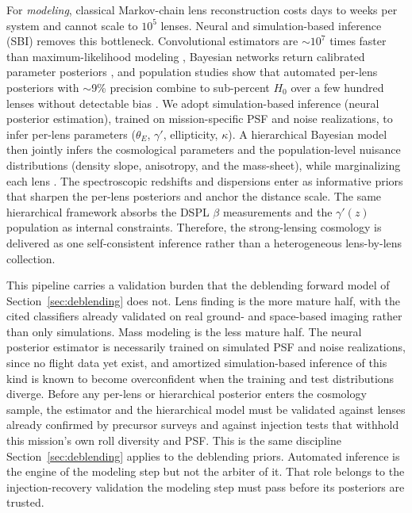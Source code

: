 \documentclass[10pt,onecolumn]{article}
\begin{document}
For \emph{modeling}, classical Markov-chain lens reconstruction costs days to weeks per system and cannot scale to $10^5$ lenses. Neural and simulation-based inference (SBI) removes this bottleneck. Convolutional estimators are $\sim$$10^7$ times faster than maximum-likelihood modeling \cite{hezaveh2017}, Bayesian networks return calibrated parameter posteriors \cite{perreaultlevasseur2017}, and population studies show that automated per-lens posteriors with $\sim$9\% precision combine to sub-percent $H_0$ over a few hundred lenses without detectable bias \cite{park2021}. We adopt simulation-based inference (neural posterior estimation), trained on mission-specific PSF and noise realizations, to infer per-lens parameters ($\theta_E$, $\gamma'$, ellipticity, $\kappa$). A hierarchical Bayesian model then jointly infers the cosmological parameters and the population-level nuisance distributions (density slope, anisotropy, and the mass-sheet), while marginalizing each lens \cite{wagnercarena2021,legin2023}. The spectroscopic redshifts and dispersions enter as informative priors that sharpen the per-lens posteriors and anchor the distance scale. The same hierarchical framework absorbs the DSPL $\beta$ measurements and the $\gamma'(z)$ population as internal constraints. Therefore, the strong-lensing cosmology is delivered as one self-consistent inference rather than a heterogeneous lens-by-lens collection.

This pipeline carries a validation burden that the deblending forward model of Section~\ref{sec:deblending} does not. Lens finding is the more mature half, with the cited classifiers already validated on real ground- and space-based imaging rather than only simulations. Mass modeling is the less mature half. The neural posterior estimator is necessarily trained on simulated PSF and noise realizations, since no flight data yet exist, and amortized simulation-based inference of this kind is known to become overconfident when the training and test distributions diverge. Before any per-lens or hierarchical posterior enters the cosmology sample, the estimator and the hierarchical model must be validated against lenses already confirmed by precursor surveys and against injection tests that withhold this mission's own roll diversity and PSF. This is the same discipline Section~\ref{sec:deblending} applies to the deblending priors. Automated inference is the engine of the modeling step but not the arbiter of it. That role belongs to the injection-recovery validation the modeling step must pass before its posteriors are trusted.
\end{document}
